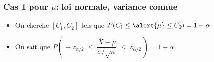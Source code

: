 \documentclass{BeamerTemplate}
\begin{document}
\begin{frame}[t]
\begin{center}
    
\end{center}

\end{frame}


\begin{frame}[t]
 \frametitle{Cas 1 pour $\mu$: loi normale, variance connue}

\begin{itemize} \itemsep3mm
\item On cherche $[C_1, C_2]$ tels que $P(C_1\le \alert{\mu} \le C_2)=1-\alpha$
\item On sait que $P\left(\,-z_{\alpha/2}\;\le \;\dfrac{\overline X - \mu}{\sigma/\sqrt{n}}\;\le \;z_{\alpha/2}\,\right)=1-\alpha$
\end{itemize}

\end{frame}

\end{document}
